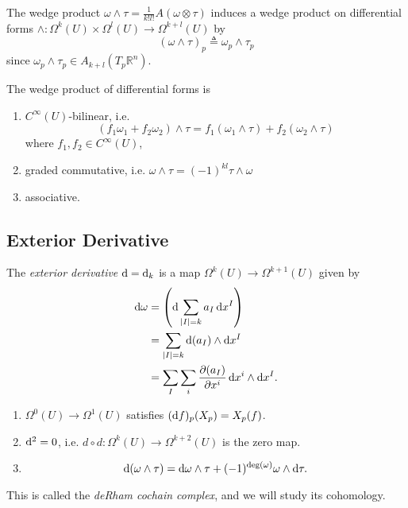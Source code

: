 The wedge product
$\omega \wedge \tau = \frac{1}{k! l!}A(\omega \otimes \tau)$
induces a wedge product on differential forms
$\wedge : \Omega^k(U) \times \Omega^l(U) \to \Omega^{k+l}(U)$
by
$$
(\omega \wedge \tau)_p \triangleq \omega_p \wedge \tau_p
$$
since $\omega_p \wedge \tau_p \in A_{k+l}(T_p \mathbb{R}^n)$.

The wedge product of differential forms is
\begin{enumerate}
  \item{
    $C^\infty(U)$-bilinear, i.e.
    $$
      (f_1 \omega_1 + f_2 \omega_2) \wedge \tau
    = f_1(\omega_1 \wedge \tau) + f_2(\omega_2 \wedge \tau)
    $$
    where $f_1, f_2 \in C^\infty(U)$,
  }
  \item{
    graded commutative, i.e.
    $\omega \wedge \tau = (-1)^{kl} \tau \wedge \omega$
  }
  \item{
    associative.
  }
\end{enumerate}

\subsection{Exterior Derivative}
\begin{defn}
The \emph{exterior derivative} $\mathop{}\!\mathrm{d} = \mathop{}\!\mathrm{d}_k$ is a map
$\Omega^k(U) \to \Omega^{k+1}(U)$ given by
\begin{align*}
   \mathop{}\!\mathrm{d} \omega
&= \left(
     \mathop{}\!\mathrm{d} \sum_{|I| = k} a_I \mathop{}\!\mathrm{d} x^I
   \right) \\
&= \sum_{|I| = k} \mathop{}\!\mathrm{d} (a_I) \wedge \mathop{}\!\mathrm{d} x^I \\
&= \sum_I \sum_i
     \frac{\partial (a_I)}
          {\partial x^i}
     \mathop{}\!\mathrm{d} x^i \wedge \mathop{}\!\mathrm{d} x^I.
\end{align*}
\end{defn}

\begin{remark}[Properties]
  \begin{enumerate}
    \item{
      $\Omega^0(U) \to \Omega^1(U)$ satisfies
      $(\mathop{}\!\mathrm{d} f)_p(X_p) = X_p(f)$.
    }
    \item{
      $\mathop{}\!\mathrm{d}^2 = 0$, i.e.
      $d \circ d : \Omega^k(U) \to \Omega^{k+2}(U)$ is the zero map.
    }
    \item{
      $$
        \mathop{}\!\mathrm{d} (\omega \wedge \tau)
      = \mathop{}\!\mathrm{d} \omega \wedge \tau
      + (-1)^{\deg(\omega)} \omega \wedge \mathop{}\!\mathrm{d} \tau.
      $$
    }
  \end{enumerate}
  This is called the \emph{deRham cochain complex}, and we will study
  its cohomology.
\end{remark}


